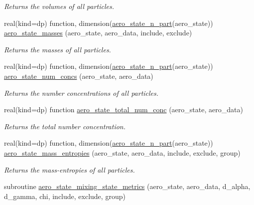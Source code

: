 \begin{DoxyCompactItemize}
\begin{DoxyCompactList}\small\item\em Returns the volumes of all particles. \end{DoxyCompactList}\item 
real(kind=dp) function, dimension(\mbox{\hyperlink{namespacepmc__aero__state_a94155bf7fa94e7c3ab722a5a1dacac98}{aero\+\_\+state\+\_\+n\+\_\+part}}(aero\+\_\+state)) \mbox{\hyperlink{namespacepmc__aero__state_ae9fa229a50576c4bce900bcb21c4e73c}{aero\+\_\+state\+\_\+masses}} (aero\+\_\+state, aero\+\_\+data, include, exclude)
\begin{DoxyCompactList}\small\item\em Returns the masses of all particles. \end{DoxyCompactList}\item 
real(kind=dp) function, dimension(\mbox{\hyperlink{namespacepmc__aero__state_a94155bf7fa94e7c3ab722a5a1dacac98}{aero\+\_\+state\+\_\+n\+\_\+part}}(aero\+\_\+state)) \mbox{\hyperlink{namespacepmc__aero__state_a31dd92148979397fc0b7bc5fd056a064}{aero\+\_\+state\+\_\+num\+\_\+concs}} (aero\+\_\+state, aero\+\_\+data)
\begin{DoxyCompactList}\small\item\em Returns the number concentrations of all particles. \end{DoxyCompactList}\item 
real(kind=dp) function \mbox{\hyperlink{namespacepmc__aero__state_a6e7b882b542eb7dd907ec490ea45c29b}{aero\+\_\+state\+\_\+total\+\_\+num\+\_\+conc}} (aero\+\_\+state, aero\+\_\+data)
\begin{DoxyCompactList}\small\item\em Returns the total number concentration. \end{DoxyCompactList}\item 
real(kind=dp) function, dimension(\mbox{\hyperlink{namespacepmc__aero__state_a94155bf7fa94e7c3ab722a5a1dacac98}{aero\+\_\+state\+\_\+n\+\_\+part}}(aero\+\_\+state)) \mbox{\hyperlink{namespacepmc__aero__state_a0bf5046e0ca5be2e39b436d6c7b3a4cb}{aero\+\_\+state\+\_\+mass\+\_\+entropies}} (aero\+\_\+state, aero\+\_\+data, include, exclude, group)
\begin{DoxyCompactList}\small\item\em Returns the mass-\/entropies of all particles. \end{DoxyCompactList}\item 
subroutine \mbox{\hyperlink{namespacepmc__aero__state_a370d03980bec87029d569a9b9116740d}{aero\+\_\+state\+\_\+mixing\+\_\+state\+\_\+metrics}} (aero\+\_\+state, aero\+\_\+data, d\+\_\+alpha, d\+\_\+gamma, chi, include, exclude, group)

\end{DoxyCompactItemize}
